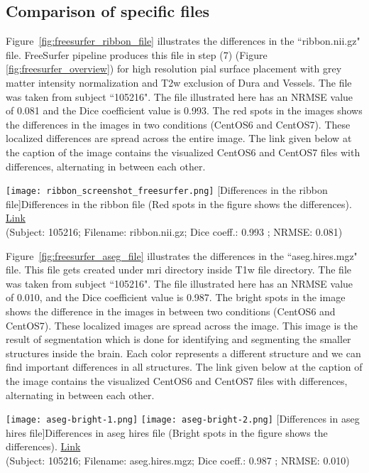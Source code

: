 \subsection{Comparison of specific files}
Figure~\ref{fig:freesurfer_ribbon_file} illustrates the differences in the ``ribbon.nii.gz" file. FreeSurfer pipeline produces this file in step (7) (Figure \ref{fig:freesurfer_overview}) for high resolution pial surface placement with grey matter intensity normalization and T2w exclusion of Dura and Vessels.
The file was taken from subject ``105216". The file illustrated here has an NRMSE value of 0.081 and the Dice coefficient value is 0.993. The red spots in the images shows the differences in the images in two conditions (CentOS6 and CentOS7). These localized differences are spread across the entire image.
The link given below at the caption of the image contains the visualized CentOS6 and CentOS7 files with differences, alternating in between each other.

\begin{center}
\texttt{[image: ribbon\_screenshot\_freesurfer.png]}
[Differences in the ribbon file]{Differences in the ribbon file (Red spots in the figure shows the differences). \href{https://drive.google.com/file/d/14nQNb9qNxqgpUrl4D1P6BYplXsGpNUx_/view?usp=sharing}{Link}\\(Subject: 105216; Filename: ribbon.nii.gz; Dice coeff.: 0.993 ; NRMSE: 0.081)}
\label{fig:freesurfer_ribbon_file}
\end{center}

Figure~\ref{fig:freesurfer_aseg_file} illustrates the differences in the ``aseg.hires.mgz" file. This file gets created under mri directory inside T1w file directory. The file was taken from subject ``105216". The file illustrated here has an NRMSE value of 0.010, and the Dice coefficient value is 0.987. The bright spots in the image shows the difference in the images in between two conditions (CentOS6 and CentOS7). These localized images are spread across the image. This image is the result of segmentation which is done for identifying and segmenting the smaller structures inside the brain. Each color represents a different structure and we can find important differences in all structures. The link given below at the caption of the image contains the visualized CentOS6 and CentOS7 files with differences, alternating in between each other.

\begin{center}
\texttt{[image: aseg-bright-1.png]}%
\texttt{[image: aseg-bright-2.png]}
  [Differences in aseg hires file]{Differences in aseg hires file (Bright spots in the figure shows the differences). \href{https://drive.google.com/file/d/1WUwWp5muXvotbMQqTqR5LcMyncH1ET3P/view?usp=sharing}{Link}\\(Subject: 105216; Filename: aseg.hires.mgz; Dice coeff.: 0.987 ; NRMSE: 0.010)}
\label{fig:freesurfer_aseg_file}
\end{center}

